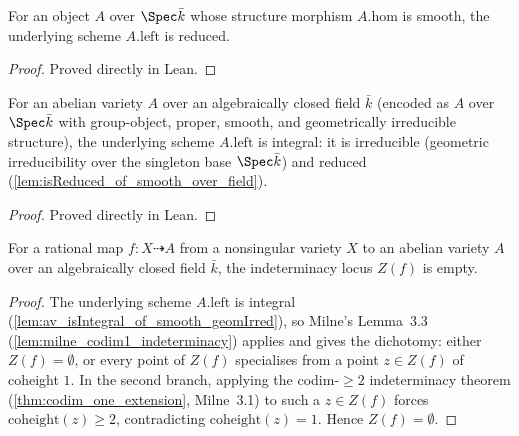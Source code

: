\begin{lemma}
  \label{lem:isReduced_of_smooth_over_field}
  For an object \(A\) over \(\Spec \bar k\) whose structure morphism
  \(A.\mathrm{hom}\) is smooth, the underlying scheme \(A.\mathrm{left}\) is
  reduced.
  \begin{proof}
    Proved directly in Lean.
  \end{proof}
\end{lemma}

\begin{lemma}
  \label{lem:av_isIntegral_of_smooth_geomIrred}
  For an abelian variety \(A\) over an algebraically closed field \(\bar k\)
  (encoded as \(A\) over \(\Spec \bar k\) with group-object, proper, smooth, and
  geometrically irreducible structure), the underlying scheme \(A.\mathrm{left}\)
  is integral: it is irreducible (geometric irreducibility over the singleton
  base \(\Spec \bar k\)) and reduced
  (\cref{lem:isReduced_of_smooth_over_field}).
  \begin{proof}
    Proved directly in Lean.
  \end{proof}
\end{lemma}

\begin{lemma}
  \label{lem:av_indeterminacyLocus_eq_empty}
  For a rational map \(f \colon X \dashrightarrow A\) from a nonsingular variety
  \(X\) to an abelian variety \(A\) over an algebraically closed field \(\bar k\),
  the indeterminacy locus \(Z(f)\) is empty.
  \begin{proof}
    The underlying scheme \(A.\mathrm{left}\) is integral
    (\cref{lem:av_isIntegral_of_smooth_geomIrred}), so Milne's Lemma~3.3
    (\cref{lem:milne_codim1_indeterminacy}) applies and gives the dichotomy: either
    \(Z(f) = \emptyset\), or every point of \(Z(f)\) specialises from a point
    \(z \in Z(f)\) of coheight \(1\). In the second branch, applying the
    codim-\(\geq 2\) indeterminacy theorem (\cref{thm:codim_one_extension},
    Milne~3.1) to such a \(z \in Z(f)\) forces \(\mathrm{coheight}(z) \geq 2\),
    contradicting \(\mathrm{coheight}(z) = 1\). Hence \(Z(f) = \emptyset\).
  \end{proof}
\end{lemma}

